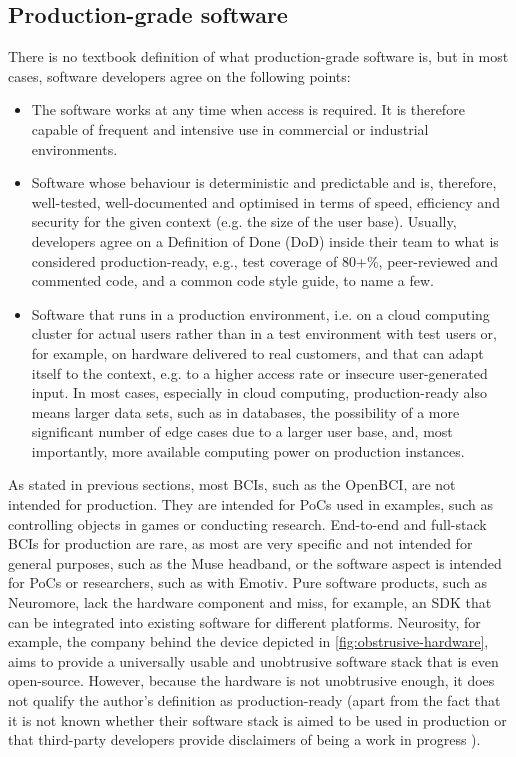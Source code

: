 \subsection{Production-grade software}
\label{chapter2-production-grade-software}

There is no textbook definition of what production-grade software is, but in most cases, software developers agree on the following points:

\begin{itemize}
  \item The software works at any time when access is required. It is therefore capable of frequent and intensive use in commercial or industrial environments.
  \item Software whose behaviour is deterministic and predictable and is, therefore, well-tested, well-documented and optimised in terms of speed, efficiency and security for the given context (e.g. the size of the user base). Usually, developers agree on a Definition of Done (DoD) inside their team to what is considered production-ready, e.g., test coverage of 80+\%, peer-reviewed and commented code, and a common code style guide, to name a few.
  \item Software that runs in a production environment, i.e. on a cloud computing cluster for actual users rather than in a test environment with test users or, for example, on hardware delivered to real customers, and that can adapt itself to the context, e.g. to a higher access rate or insecure user-generated input. In most cases, especially in cloud computing, production-ready also means larger data sets, such as in databases, the possibility of a more significant number of edge cases due to a larger user base, and, most importantly, more available computing power on production instances.
\end{itemize}

As stated in previous sections, most BCIs, such as the OpenBCI, are not intended for production. They are intended for PoCs used in examples, such as controlling objects in games or conducting research. End-to-end and full-stack BCIs for production are rare, as most are very specific and not intended for general purposes, such as the Muse headband, or the software aspect is intended for PoCs or researchers, such as with Emotiv. Pure software products, such as Neuromore, lack the hardware component and miss, for example, an SDK that can be integrated into existing software for different platforms. Neurosity, for example, the company behind the device depicted in \autoref{fig:obstrusive-hardware}, aims to provide a universally usable and unobtrusive software stack that is even open-source. However, because the hardware is not unobtrusive enough, it does not qualify the author's definition as production-ready (apart from the fact that it is not known whether their software stack is aimed to be used in production \citep{neurosity_neurosity_2022} or that third-party developers provide disclaimers of being a work in progress \citep{turney_notion_2022}).

